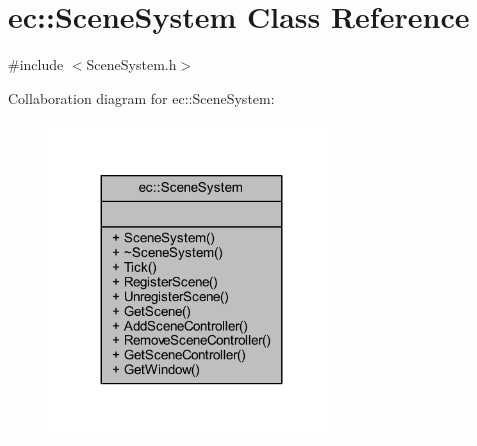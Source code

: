 \hypertarget{classec_1_1_scene_system}{}\section{ec\+:\+:Scene\+System Class Reference}
\label{classec_1_1_scene_system}


{\ttfamily \#include $<$Scene\+System.\+h$>$}



Collaboration diagram for ec\+:\+:Scene\+System\+:\nopagebreak
\begin{figure}[H]
\begin{center}
\leavevmode
\includegraphics[width=215pt]{classec_1_1_scene_system__coll__graph}
\end{center}
\end{figure}
